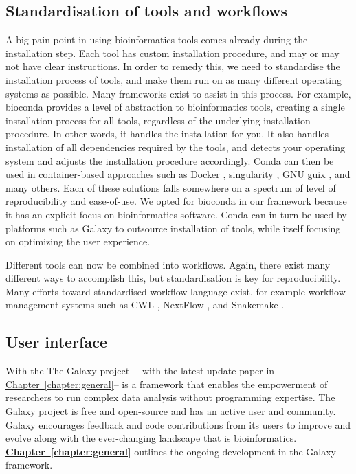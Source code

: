 \subsection{Standardisation of tools and workflows}
A big pain point in using bioinformatics tools comes already during the installation step. Each tool has custom installation procedure, and may or may not have clear instructions. In order to remedy this, we need to standardise the installation process of tools, and make them run on as many different operating systems as possible. Many frameworks exist to assist in this process. For example, bioconda \cite{gruning2018bioconda} provides a level of abstraction to bioinformatics tools, creating a single installation process for all tools, regardless of the underlying installation procedure. In other words, it handles the installation for you. It also handles installation of all dependencies required by the tools, and detects your operating system and adjusts the installation procedure accordingly. Conda can then be used in container-based approaches such as Docker \cite{}, singularity \cite{}, GNU guix \cite{courtes2013function}, and many others. Each of these solutions falls somewhere on a spectrum of level of reproducibility and ease-of-use. We opted for bioconda in our framework because it has an explicit focus on bioinformatics software. Conda can in turn be used by platforms such as Galaxy to outsource installation of tools, while itself focusing on optimizing the user experience.

Different tools can now be combined into workflows. Again, there exist many different ways to accomplish this, but standardisation is key for reproducibility. Many efforts toward standardised workflow language exist, for example workflow management systems such as CWL \cite{}, NextFlow \cite{}, and Snakemake \cite{}.



\subsection{User interface}

With the
The Galaxy project~\cite{giardine2005galaxy,blankenberg2010galaxy,afgan2016galaxy} --with the latest update paper \cite{afgan2018galaxy} in \hyperref[chapter:galaxy]{Chapter~\ref{chapter:general}}-- is a framework that enables the empowerment of researchers to run complex data analysis without programming expertise. The Galaxy project is free and open-source and has an active user and community. Galaxy encourages feedback and code contributions from its users to improve and evolve along with the ever-changing landscape that is bioinformatics. \hyperref[chapter:galaxy]{\textbf{Chapter~\ref{chapter:general}}} outlines the ongoing development in the Galaxy framework.


